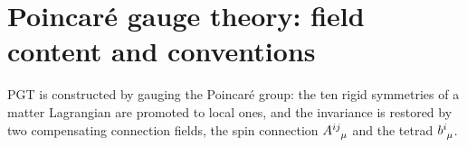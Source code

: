
\section{Poincar\'{e} gauge theory: field content and conventions}
\label{PGTBackground}

PGT is constructed by gauging the Poincar\'{e}
group: the ten rigid symmetries of a matter Lagrangian are promoted
to local ones, and the invariance is restored by two
compensating connection fields, the spin connection $\tensor{A}{^{ij}_\mu}$
and the tetrad $\tensor{b}{^i_\mu}$.

